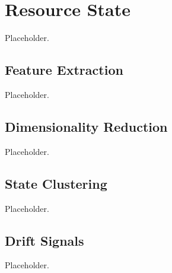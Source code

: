 \chapter{Resource State}
\label{chap:resource}

Placeholder.

\section{Feature Extraction}
\label{sec:resource:feature_extraction}
Placeholder.

\section{Dimensionality Reduction}
\label{sec:resource:reduction}
Placeholder.

\section{State Clustering}
\label{sec:resource:state_clustering}
Placeholder.

\section{Drift Signals}
\label{sec:resource:drift_signals}
Placeholder.
